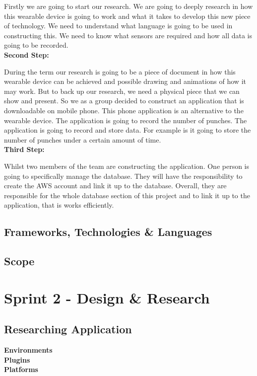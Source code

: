 \documentclass[a4paper,12pt]{report}
\begin{document}
Firstly we are going to start our research. We are going to deeply research in how this wearable device is going to work and what it takes to develop this new piece of technology. We need to understand what language is going to be used in constructing this. We need to know what sensors are required and how all data is going to be recorded.
\\
\textbf{Second Step:}

During the term our research is going to be a piece of document in how this wearable device can be achieved and possible drawing and animations of how it may work. But to back up our research, we need a physical piece that we can show and present. So we as a group decided to construct an application that is downloadable on mobile phone. This phone application is an alternative to the wearable device. The application is going to record the number of punches. The application is going to record and store data. For example is it going to store the number of punches under a certain amount of time.
\\
\textbf{Third Step:}

Whilst two members of the team are constructing the application. One person is going to specifically manage the database. They will have the responsibility to create the AWS account and link it up to the database. Overall, they are responsible for the whole database section of this project and to link it up to the application, that is works efficiently.

\subsection{Frameworks, Technologies \& Languages}

\subsection{Scope}

\section{Sprint 2 - Design & Research}
\subsection{Researching Application}
\textbf{Environments}\\
\textbf{Plugins}\\
\textbf{Platforms}
\end{document}
